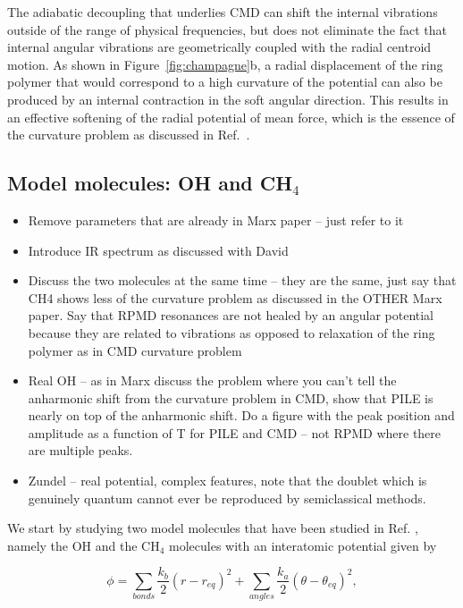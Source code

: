 \documentclass[aps,prb,superscriptaddress,amsmath,amssymb,showpacs,twocolumn]{revtex4}
\begin{document}
The adiabatic decoupling that underlies CMD can shift the internal vibrations outside of the range of 
physical frequencies, but does not eliminate the fact that internal angular vibrations are geometrically 
coupled with the radial centroid motion. 
As shown in Figure~\ref{fig:champagne}b, a radial displacement of the ring polymer that would correspond to a high 
curvature of the potential can also be produced by an internal contraction in the soft angular
direction. This results in an effective softening of the radial potential of mean force, which is the essence
of the curvature problem as discussed in Ref.~\cite{witt+09jcp}.


\subsection{Model molecules: OH and CH$_4$}

\begin{itemize}
\item Remove parameters that are already in Marx paper -- just refer to it 
\item Introduce IR spectrum as discussed with David 
\item Discuss the two molecules at the same time -- they are the same, just say
that CH4 shows less of the curvature problem as discussed in the OTHER Marx paper.  
Say that RPMD resonances are not healed by an angular potential because they are related
to vibrations as opposed to relaxation of the ring polymer as in CMD curvature problem 
\item Real OH -- as in Marx discuss the problem where you can't tell the anharmonic shift from
the curvature problem in CMD, show that PILE is nearly on top of the anharmonic shift. Do a figure with the peak
position and amplitude as a function of T for PILE and CMD -- not RPMD where there are multiple peaks. 
\item Zundel -- real potential, complex features, note that the doublet which is genuinely quantum 
cannot ever be reproduced by semiclassical methods.
\end{itemize}



We start by studying two model molecules that have been studied in Ref. \cite{witt+09jcp},
namely the OH and the CH$_4$ molecules with an interatomic potential given by

\begin{equation}
\phi=\sum_{bonds} \frac{k_b}{2} (r-r_{eq})^2 + \sum_{angles} \frac{k_a}{2}(\theta - \theta_{eq})^2,
\label{eq:model}
\end{equation}
\end{document}
